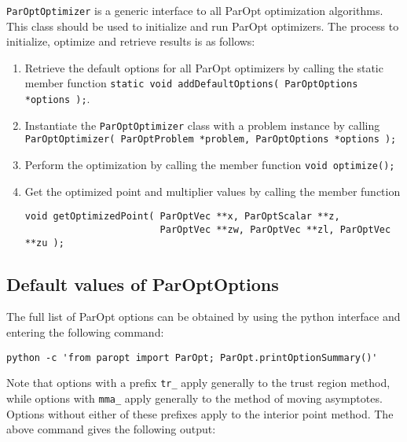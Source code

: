 \documentclass[12pt]{article}
\begin{document}
\texttt{ParOptOptimizer} is a generic interface to all ParOpt optimization algorithms.
This class should be used to initialize and run ParOpt optimizers.
The process to initialize, optimize and retrieve results is as follows:

\begin{enumerate}
\item Retrieve the default options for all ParOpt optimizers by calling the static member function
\texttt{static void addDefaultOptions( ParOptOptions *options );}.

\item Instantiate the \texttt{ParOptOptimizer} class with a problem instance by calling \texttt{ParOptOptimizer( ParOptProblem *problem, ParOptOptions *options );}

\item Perform the optimization by calling the member function \texttt{void optimize();}

\item Get the optimized point and multiplier values by calling the member function
\begin{verbatim}
void getOptimizedPoint( ParOptVec **x, ParOptScalar **z,
                        ParOptVec **zw, ParOptVec **zl, ParOptVec **zu );
\end{verbatim}
\end{enumerate}

\subsection{Default values of ParOptOptions}

The full list of ParOpt options can be obtained by using the python interface and entering the following command:
\begin{verbatim}
python -c 'from paropt import ParOpt; ParOpt.printOptionSummary()'
\end{verbatim}
%
Note that options with a prefix \texttt{tr\_} apply generally to the trust region method, while options with \texttt{mma\_} apply generally to the method of moving asymptotes.
Options without either of these prefixes apply to the interior point method.
The above command gives the following output:
\end{document}
